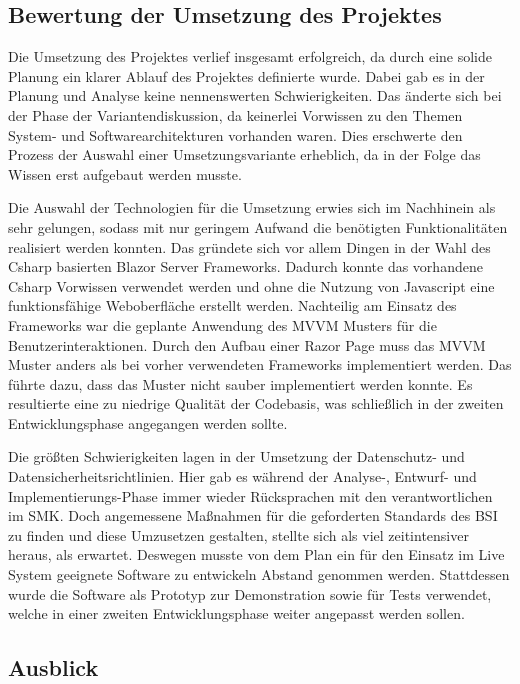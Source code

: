 \subsection{Bewertung der Umsetzung des Projektes}
\label{sec:Bewertung} %
Die Umsetzung des Projektes verlief insgesamt erfolgreich, da durch eine solide Planung ein klarer Ablauf des Projektes definierte wurde. Dabei gab es in der Planung und Analyse keine nennenswerten Schwierigkeiten. Das änderte sich bei der Phase der Variantendiskussion, da keinerlei Vorwissen zu den Themen System- und Softwarearchitekturen vorhanden waren. Dies erschwerte den Prozess der Auswahl einer Umsetzungsvariante erheblich, da in der Folge das Wissen erst aufgebaut werden musste.

Die Auswahl der Technologien für die Umsetzung erwies sich im Nachhinein als sehr gelungen, sodass mit nur geringem Aufwand die benötigten Funktionalitäten realisiert werden konnten. Das gründete sich vor allem Dingen in der Wahl des Csharp basierten Blazor Server Frameworks. Dadurch konnte das vorhandene Csharp Vorwissen verwendet werden und ohne die Nutzung von Javascript eine funktionsfähige Weboberfläche erstellt werden. Nachteilig am Einsatz des Frameworks war die geplante Anwendung des MVVM Musters für die Benutzerinteraktionen. Durch den Aufbau einer Razor Page muss das MVVM Muster anders als bei vorher verwendeten Frameworks implementiert werden. Das führte dazu, dass das Muster nicht sauber implementiert werden konnte. Es resultierte eine zu niedrige Qualität der Codebasis, was schließlich in der zweiten Entwicklungsphase angegangen werden sollte.

Die größten Schwierigkeiten lagen in der Umsetzung der Datenschutz- und Datensicherheitsrichtlinien. Hier gab es während der Analyse-, Entwurf- und Implementierungs-Phase immer wieder Rücksprachen mit den verantwortlichen im SMK. Doch angemessene Maßnahmen für die geforderten Standards des BSI zu finden und diese Umzusetzen gestalten, stellte sich als viel zeitintensiver heraus, als erwartet. Deswegen musste von dem Plan ein für den Einsatz im Live System geeignete Software zu entwickeln Abstand genommen werden. Stattdessen wurde die Software als Prototyp zur Demonstration sowie für Tests verwendet, welche in einer zweiten Entwicklungsphase weiter angepasst werden sollen.

\subsection{Ausblick}
\label{sec:Ausblick}



